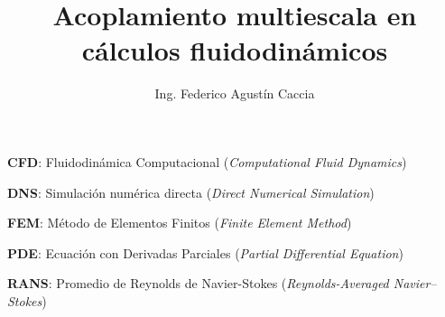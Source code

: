 \documentclass[12pt,screen,twoside,pagebackref]{ibtesis}
\title{Acoplamiento multiescala en cálculos fluidodinámicos}
\author{Ing. Federico Agustín Caccia}
\begin{document}
\renewcommand{\tablename}{Tabla} %


\begin{preliminary}



\begin{abreviaturas} %

\textbf{CFD}: Fluidodinámica Computacional (\textit{Computational Fluid Dynamics})

\textbf{DNS}: Simulación numérica directa (\textit{Direct Numerical Simulation})

\textbf{FEM}: Método de Elementos Finitos (\textit{Finite Element Method})

\textbf{PDE}: Ecuación con Derivadas Parciales (\textit{Partial Differential Equation})

\textbf{RANS}: Promedio de Reynolds de Navier-Stokes (\textit{Reynolds-Averaged Navier–Stokes})

\end{abreviaturas}

\tableofcontents                %

\listoffigures                  %

\listoftables                   %



\end{preliminary}


%

\appendix



\begin{biblio}

\end{biblio}
\end{document}
